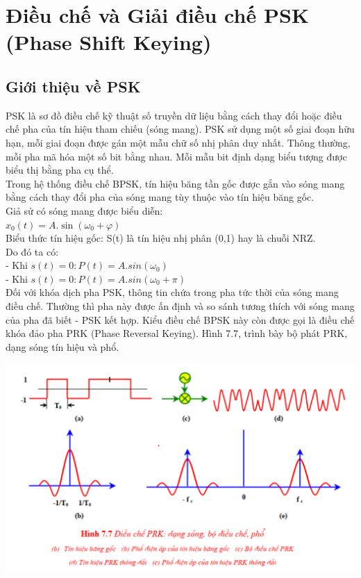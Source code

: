 
\section{Điều chế và Giải điều chế PSK (Phase Shift Keying)}
\subsection{Giới thiệu về PSK}
PSK là sơ đồ điều chế kỹ thuật số truyền dữ liệu bằng cách thay đổi hoặc điều chế
pha của tín hiệu tham chiếu (sóng mang). PSK sử dụng một số giai đoạn hữu hạn, mỗi
giai đoạn được gán một mẫu chữ số nhị phân duy nhất. Thông thường, mỗi pha mã hóa
một số bit bằng nhau. Mỗi mẫu bit định dạng biểu tượng được biểu thị bằng pha cụ thể. \\
Trong hệ thống điều chế BPSK, tín hiệu băng tần gốc được gắn vào sóng mang bằng
cách thay đổi pha của sóng mang tùy thuộc vào tín hiệu băng gốc. \\
Giả sử có sóng mang được biểu diễn: \\
 $ x_{0}(t) = A.\sin(\omega_{0} + \varphi) $\\
Biểu thức tín hiệu gốc: S(t) là tín hiệu nhị phân (0,1) hay là chuỗi NRZ. \\ 
Do đó ta có: \\ 
- Khi $ s(t) = 0: P(t) = A.sin(\omega_{0}) $ \\
- Khi $ s(t) = 0: P(t) = A.sin(\omega_{0} + \pi) $ \\ 

Đối với khóa dịch pha PSK, thông tin chứa trong pha tức thời của sóng mang điều chế.
Thường thì pha này được ấn định và so sánh tương thích với sóng mang của pha đã biết
- PSK kết hợp. Kiểu điều chế BPSK này còn được gọi là điều chế khóa đảo pha PRK
(Phase Reversal Keying). Hình 7.7, trình bày bộ phát PRK, dạng sóng tín hiệu và phổ.
\begin{center}
     \includegraphics[scale=.5]{Img/dieuchepho.png}
\end{center}
